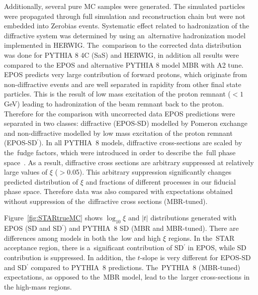 Additionally, several pure MC samples were generated. The simulated particles were propagated through full simulation and reconstruction chain but were  not embedded  into Zerobias events.   
Systematic effect related to hadronization of the diffractive system was determined by using an~alternative hadronization model implemented in HERWIG. The~comparison to the corrected data distribution was done for PYTHIA 8 4C (\ac{SaS}) and HERWIG, in addition all results were compared to the EPOS and alternative PYTHIA 8 model  \ac{MBR}  with A2 tune. EPOS predicts very large contribution of forward 
protons, which originate from non-diffractive events and are well separated in rapidity from other final state particles. This is the result of low mass excitation of the proton remnant ($<1$ GeV) leading to hadronization of the beam remnant back to the proton. Therefore for the comparison with uncorrected data EPOS predictions were separated in two classes: diffractive (EPOS-SD) modelled by Pomeron exchange and non-diffractive modelled  by low mass excitation of the proton remnant (EPOS-SD$^\prime$). In all PYTHIA~8 models, diffractive cross-sections are scaled by the~fudge factors, which were introduced in order to describe the~full phase space~\cite{Sjostrand:2006za,MBR:intro}. As a result, diffractive cross sections are arbitrary suppressed at 
relatively large values of $\xi$ ($>$0.05). This arbitrary suppression significantly changes predicted distribution of $\xi$ and fractions of different processes in our fiducial phase space. Therefore data was also compared with expectations obtained without suppression of the~diffractive cross sections (MBR-tuned).

Figure~\ref{fig:STARtrueMC} shows $\log_{10}\xi$ and $|t|$ distributions generated with  EPOS (SD and SD$^\prime$) and PYTHIA~8 SD (MBR and MBR-tuned). There are differences among models in both the~low and high $\xi$ regions. In the~STAR acceptance region, there is a~significant contribution of SD$^\prime$ in EPOS, while SD contribution is suppressed. In addition, the $t$-slope is  very different for EPOS-SD and SD$^\prime$ compared to PYTHIA~8 predictions. The~PYTHIA~8 (MBR-tuned) expectations, as opposed to the~MBR model,  lead
to the~larger cross-sections in the high-mass regions.
 
